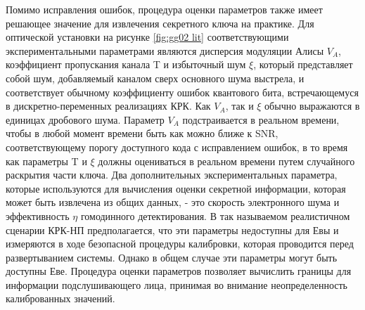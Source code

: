 Помимо исправления ошибок, процедура оценки параметров также имеет решающее значение для извлечения секретного ключа на практике. Для оптической установки на рисунке \ref{fig:gg02 lit} соответствующими экспериментальными параметрами являются дисперсия модуляции Алисы $V_A$, коэффициент пропускания канала T и избыточный шум $\xi$, который представляет собой шум, добавляемый каналом сверх основного шума выстрела, и соответствует обычному коэффициенту ошибок квантового бита, встречающемуся в дискретно-переменных реализациях КРК. Как $V_A$, так и $\xi$ обычно выражаются в единицах дробового шума. Параметр $V_A$ подстраивается в реальном времени, чтобы в любой момент времени быть как можно ближе к SNR, соответствующему порогу доступного кода с исправлением ошибок, в то время как параметры T и $\xi$ должны оцениваться в реальном времени путем случайного раскрытия части ключа. Два дополнительных экспериментальных параметра, которые используются для вычисления оценки секретной информации, которая может быть извлечена из общих данных, - это скорость электронного шума и эффективность $\eta$ гомодинного детектирования. В так называемом реалистичном сценарии КРК-НП предполагается, что эти параметры недоступны для Евы и измеряются в ходе безопасной процедуры калибровки, которая проводится перед развертыванием системы. Однако в общем случае эти параметры могут быть доступны Еве. Процедура оценки параметров позволяет вычислить границы для информации подслушивающего лица, принимая во внимание неопределенность калиброванных значений.

